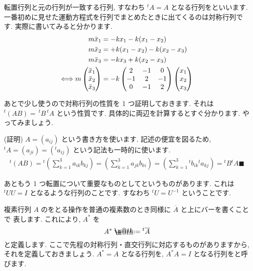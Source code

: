 \documentclass[openany, a4paper, oneside]{jsbook}
\makeatletter
\newcommand*{\defeq}{\mathrel{\rlap{%
\raisebox{0.3ex}{$\m@th\cdot$}}%
\raisebox{-0.3ex}{$\m@th\cdot$}}%
=}
\theoremstyle{break}
\theoremstyle{breakdefn}
\makeatother
\begin{document}
転置行列と元の行列が一致する行列, すなわち $^{t} A = A$ となる行列をといいます.
一番初めに見せた運動方程式を行列でまとめたときに出てくるのは対称行列です. 実際に書いてみると分かります.
    \begin{align}
        m\ddot{x}_{1} &= -kx_1 - k (x_1 - x_2 ) \notag \\
        m\ddot{x}_{2} &= + k (x_1 - x_2 ) - k (x_2 - x_3) \notag \\
        m\ddot{x}_{3} &= -kx_3 +k (x_2 - x_3 )  \notag \\
        \Longleftrightarrow
        m \begin{pmatrix} \ddot{x}_{1} \\ \ddot{x}_{2} \\ \ddot{x}_{3} \end{pmatrix}
        &= -k \begin{pmatrix} 2 & -1 & 0 \\ -1 & 2 & -1 \\ 0 & -1 & 2 \end{pmatrix}
        \begin{pmatrix} x_{1} \\ x_{2} \\ x_{3} \end{pmatrix} \notag
    \end{align}

あとで少し使うので対称行列の性質を 1 つ証明しておきます. それは $^{t}(AB) =\, ^{t}B \, ^{t}A$ という性質です.
具体的に両辺を計算するとすぐ分かります. やってみましょう.

(証明) $A=(a_{ij})$ という書き方を使います.
記述の便宜を図るため,  $^{t}A = (a_{j i}) = (^{t}a_{ij})$ という記法も一時的に使います.
    \begin{align}
        {^t}(AB)
        = {^t} \left ( \sum_{k=1}^3 a_{i k}b_{k j} \right)
        = \left ( \sum_{k=1}^3 a_{j k}b_{k i} \right)
        = \left ( \sum_{k=1}^3 {^t}b_{i k} {^t}a_{k j} \right)
        = {^t}B {^t}A \blacksquare
    \end{align}

あともう 1 つ転置について重要なものとしてというものがあります.
これは $^{t}U U=I$ となるような行列のことです.
すなわち $^{t}U = U^{-1}$ ということです.


複素行列 $A$ のをとる操作を普通の複素数のとき同様に $\overline{A}$ と上にバーを書くことで
表します.
これにより,  $A^{*}$ を
    \begin{equation}
        A^{*} \defeq {^t}\overline{A}
    \end{equation}
と定義します. ここで先程の対称行列・直交行列に対応するものがありますから, それを定義しておきましょう.
 $A^{*}=A$ となる行列を,  $A^{*}A = I$ となる行列をと呼びます.
\end{document}
